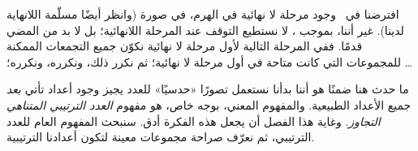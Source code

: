 \documentclass[../../../include/open-logic-section]{subfiles}
\begin{document}


افترضنا في~ وجود مرحلة لا نهائية في الهرم، في صورة
\stagesinf{} (وانظر أيضًا مسلّمة اللانهاية لدينا). غير أننا، بموجب
\stagessucc{}، لا نستطيع التوقف عند المرحلة اللانهائية؛ بل لا بد من
المضي قدمًا. ففي المرحلة التالية لأول مرحلة لا نهائية نكوّن جميع
التجمعات الممكنة للمجموعات التي كانت متاحة في أول مرحلة لا نهائية؛ ثم
نكرر ذلك، ونكرره، ونكرره؛ \dots

ما حدث هنا ضمنًا هو أننا بدأنا نستعمل تصورًا «حدسيًا» للعدد يجيز وجود
أعداد تأتي \emph{بعد} جميع الأعداد الطبيعية. والمفهوم المعني، بوجه
خاص، هو مفهوم \emph{العدد الترتيبي المتناهي التجاوز}. وغاية هذا الفصل
أن يجعل هذه الفكرة أدق. سنبحث المفهوم العام للعدد الترتيبي، ثم نعرّف
صراحة مجموعات معينة لتكون أعدادنا الترتيبية.
\end{document}
